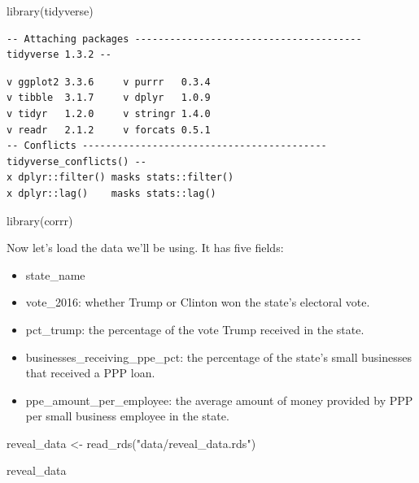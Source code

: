 \documentclass[
  letterpaper,
  DIV=11,
  numbers=noendperiod]{scrreprt}
\newenvironment{Shaded}{\begin{snugshade}}{\end{snugshade}}
\newcommand{\FunctionTok}[1]{\textcolor[rgb]{0.28,0.35,0.67}{#1}}
\newcommand{\NormalTok}[1]{\textcolor[rgb]{0.00,0.23,0.31}{#1}}
\newcommand{\OtherTok}[1]{\textcolor[rgb]{0.00,0.23,0.31}{#1}}
\newcommand{\StringTok}[1]{\textcolor[rgb]{0.13,0.47,0.30}{#1}}
\providecommand{\tightlist}{%
  \setlength{\itemsep}{0pt}\setlength{\parskip}{0pt}}\usepackage{longtable,booktabs,array}
\begin{document}
\begin{Shaded}
\begin{Highlighting}[]
\FunctionTok{library}\NormalTok{(tidyverse)}
\end{Highlighting}
\end{Shaded}

\begin{verbatim}
-- Attaching packages --------------------------------------- tidyverse 1.3.2 --
\end{verbatim}

\begin{verbatim}
v ggplot2 3.3.6     v purrr   0.3.4
v tibble  3.1.7     v dplyr   1.0.9
v tidyr   1.2.0     v stringr 1.4.0
v readr   2.1.2     v forcats 0.5.1
-- Conflicts ------------------------------------------ tidyverse_conflicts() --
x dplyr::filter() masks stats::filter()
x dplyr::lag()    masks stats::lag()
\end{verbatim}

\begin{Shaded}
\begin{Highlighting}[]
\FunctionTok{library}\NormalTok{(corrr)}
\end{Highlighting}
\end{Shaded}

Now let's load the data we'll be using. It has five fields:

\begin{itemize}
\tightlist
\item
  state\_name
\item
  vote\_2016: whether Trump or Clinton won the state's electoral vote.
\item
  pct\_trump: the percentage of the vote Trump received in the state.
\item
  businesses\_receiving\_ppe\_pct: the percentage of the state's small
  businesses that received a PPP loan.
\item
  ppe\_amount\_per\_employee: the average amount of money provided by
  PPP per small business employee in the state.
\end{itemize}

\begin{Shaded}
\begin{Highlighting}[]
\NormalTok{reveal\_data }\OtherTok{\textless{}{-}} \FunctionTok{read\_rds}\NormalTok{(}\StringTok{"data/reveal\_data.rds"}\NormalTok{)}

\NormalTok{reveal\_data}
\end{Highlighting}
\end{Shaded}
\end{document}
